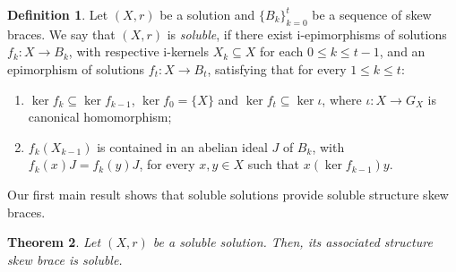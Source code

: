\documentclass[12pt, a4paper, english]{article}
\newtheorem{teorema}{Theorem}[section]
\theoremstyle{definition}
\newtheorem{definicio}[teorema]{Definition}
\theoremstyle{remark}
\begin{document}

\begin{definicio}
\label{def:soluble-solution}
Let $(X,r)$ be a solution and $\{B_k\}_{k=0}^t$ be a sequence of skew braces. We say that $(X,r)$ is \emph{soluble}, if there exist i-epimorphisms of solutions $f_k \colon X \rightarrow B_k$, with respective i-kernels $X_k \subseteq X$ for each $0\leq k \leq t-1$, and an epimorphism of solutions $f_t\colon X \rightarrow B_t$, satisfying that for every $1\leq k \leq t$:
\begin{enumerate}
\item $\ker f_{k} \subseteq \ker f_{k-1}$, $\ker f_0 = \{X\}$ and $\ker f_t \subseteq \ker \iota$, where $\iota \colon X \rightarrow G_X$ is canonical homomorphism;
\item $f_{k}(X_{k-1})$ is contained in an abelian ideal $J$ of $B_k$, with $f_k(x)J = f_k(y)J$, for every $x,y\in X$ such that $x (\ker f_{k-1}) y$.
\end{enumerate}
\end{definicio}


Our first main result shows that soluble solutions provide soluble structure skew braces.  

\begin{teorema}
\label{teo:soluble-solution->GX-soluble}
Let $(X,r)$ be a soluble solution. Then, its associated structure skew brace is soluble.
\end{teorema}
\end{document}
